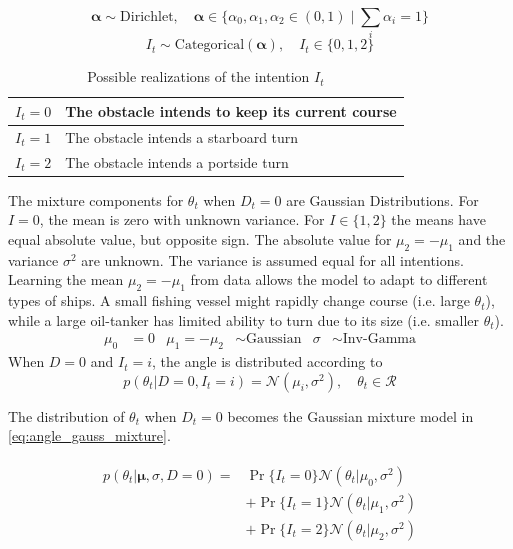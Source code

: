 \begin{equation}
    \boldsymbol{\alpha} \sim \text{Dirichlet}, \quad \boldsymbol{\alpha} \in \{\alpha_0, \alpha_1, \alpha_2 \in (0, 1) \; | \; \sum_i \alpha_i = 1 \}
\end{equation}
\begin{equation}
    I_t \sim \text{Categorical}(\boldsymbol{\alpha}), \quad I_t \in \{0, 1, 2\}
\end{equation}

\begin{table}[h]
\centering
\begin{tabular}{|l|l|}
\hline
$I_t=0$ & The obstacle intends to keep its current course \\ \hline
$I_t=1$ & The obstacle intends a starboard turn           \\ \hline
$I_t=2$ & The obstacle intends a portside turn            \\ \hline
\end{tabular}
\caption{Possible realizations of the intention $I_t$}
\label{tbl:intentions}
\end{table}


The mixture components for $\theta_t$ when $D_t=0$ are Gaussian Distributions. For $I=0$, the mean is zero with unknown variance. For $I \in \{1, 2\}$ the means have equal absolute value, but opposite sign. The absolute value for $\mu_2 = -\mu_1$ and the variance $\sigma^2$ are unknown. The variance is assumed equal for all intentions. 
Learning the mean $\mu_2 = -\mu_1$ from data allows the model to adapt to different types of ships. A small fishing vessel might rapidly change course (i.e. large $\theta_t$), while a large oil-tanker has limited ability to turn due to its size (i.e. smaller $\theta_t$). 
\begin{align}
    \mu_0 &= 0 &  \mu_{1} = - \mu_{2} &\sim \text{Gaussian} & \sigma &\sim \text{Inv-Gamma}
\end{align}
When $D=0$ and $I_t=i$, the angle is distributed according to
\begin{equation}\label{eq:theta_intention_mixture}
    p(\theta_t | D=0, I_t=i) = \mathcal{N}(\mu_i, \sigma^2), \quad \theta_t \in \mathcal{R}
\end{equation}

The distribution of $\theta_t$ when $D_t=0$ becomes the Gaussian mixture model in \cref{eq:angle_gauss_mixture}.

\begin{align}\label{eq:angle_gauss_mixture}
\begin{split}
    p(\theta_t | \boldsymbol{\mu}, \sigma, D=0) = &\Pr\{I_t=0\}\mathcal{N}(\theta_t | \mu_0, \sigma^2)\\
    &+ \Pr\{I_t=1\}\mathcal{N}(\theta_t | \mu_1, \sigma^2)\\
    &+ \Pr\{I_t=2\}\mathcal{N}(\theta_t | \mu_2, \sigma^2)
\end{split}
\end{align}

